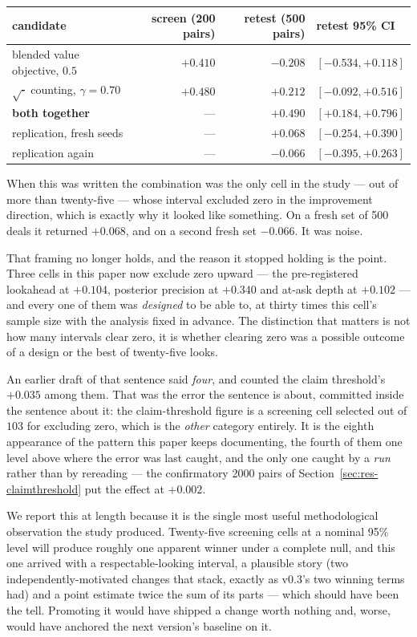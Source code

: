 \documentclass[11pt,a4paper]{article}
\begin{document}
\begin{center}
\small
\begin{tabular}{lrrl}
\toprule
candidate & screen (200 pairs) & retest (500 pairs) & retest 95\% CI \\
\midrule
blended value objective, $0.5$ & $+0.410$ & $-0.208$ & $[-0.534, +0.118]$ \\
$\sqrt{\cdot}$ counting, $\gamma = 0.70$ & $+0.480$ & $+0.212$ & $[-0.092, +0.516]$ \\
\textbf{both together} & --- & $\mathbf{+0.490}$ & $\mathbf{[+0.184, +0.796]}$ \\
\quad replication, fresh seeds & --- & $+0.068$ & $[-0.254, +0.390]$ \\
\quad replication again & --- & $-0.066$ & $[-0.395, +0.263]$ \\
\bottomrule
\end{tabular}
\end{center}

When this was written the combination was the only cell in the study --- out of
more than twenty-five --- whose interval excluded zero in the improvement
direction, which is exactly why it looked like something. On a fresh set of 500
deals it returned $+0.068$, and on a second fresh set $-0.066$. It was noise.

That framing no longer holds, and the reason it stopped holding is the point.
Three cells in this paper now exclude zero upward --- the pre-registered
lookahead at $+0.104$, posterior precision at $+0.340$ and at-ask depth at
$+0.102$ --- and every one of them was \emph{designed} to be able to, at thirty
times this cell's sample size with the analysis fixed in advance. The
distinction that matters is not how many intervals clear zero, it is whether
clearing zero was a possible outcome of a design or the best of twenty-five
looks.

An earlier draft of that sentence said \emph{four}, and counted the claim
threshold's $+0.035$ among them. That was the error the sentence is about,
committed inside the sentence about it: the claim-threshold figure is a
screening cell selected out of $103$ for excluding zero, which is the
\emph{other} category entirely. It is the eighth appearance of the pattern
this paper keeps documenting, the fourth of them one level above where the
error was last caught, and the only one caught by a \emph{run} rather than by
rereading --- the confirmatory 2000 pairs of
Section~\ref{sec:res-claimthreshold} put the effect at $+0.002$.

We report this at length because it is the single most useful methodological
observation the study produced. Twenty-five screening cells at a nominal 95\%
level will produce roughly one apparent winner under a complete null, and this
one arrived with a respectable-looking interval, a plausible story (two
independently-motivated changes that stack, exactly as v0.3's two winning terms
had) and a point estimate twice the sum of its parts --- which should have been
the tell. Promoting it would have shipped a change worth nothing and, worse,
would have anchored the next version's baseline on it.
\end{document}
